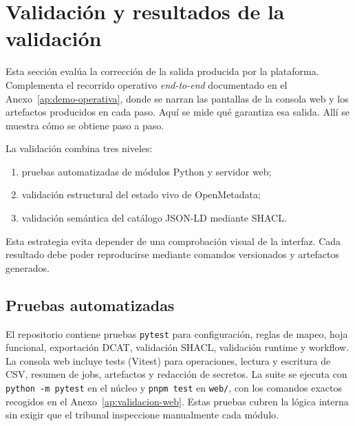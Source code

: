 \section{Validación y resultados de la validación}\label{cap:validacion}

Esta sección evalúa la corrección de la salida producida por la plataforma. Complementa el recorrido operativo \emph{end-to-end} documentado en el Anexo~\ref{ap:demo-operativa}, donde se narran las pantallas de la consola web y los artefactos producidos en cada paso. Aquí se mide qué garantiza esa salida. Allí se muestra cómo se obtiene paso a paso.

La validación combina tres niveles:

\begin{enumerate}
  \item pruebas automatizadas de módulos Python y servidor web;
  \item validación estructural del estado vivo de OpenMetadata;
  \item validación semántica del catálogo JSON-LD mediante SHACL.
\end{enumerate}

Esta estrategia evita depender de una comprobación visual de la interfaz. Cada resultado debe poder reproducirse mediante comandos versionados y artefactos generados.

\subsection{Pruebas automatizadas}

El repositorio contiene pruebas \texttt{pytest} para configuración, reglas de mapeo, hoja funcional, exportación DCAT, validación SHACL, validación runtime y workflow. La consola web incluye tests (Vitest) para operaciones, lectura y escritura de CSV, resumen de jobs, artefactos y redacción de secretos. La suite se ejecuta con \texttt{python -m pytest} en el núcleo y \texttt{pnpm test} en \texttt{web/}, con los comandos exactos recogidos en el Anexo~\ref{ap:validacion-web}. Estas pruebas cubren la lógica interna sin exigir que el tribunal inspeccione manualmente cada módulo.

